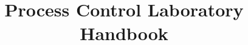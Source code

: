 \fussy

\usepackage{natbib}
\usepackage{graphicx}
\usepackage{color}
\usepackage{subfigure}
\usepackage{amsmath,amssymb}
\usepackage{rotating}
\usepackage{booktabs}
\usepackage{lscape}
\usepackage[hang, bf, small]{caption}
\usepackage{hyperref}
\usepackage{listings}
\usepackage{nomencl}
\makeglossary %
\usepackage{makeidx}
\makeindex %

\usepackage[Conny]{fncychap}
\ChTitleVar{\centering\Huge\mdseries\sffamily}
\ChRuleWidth{1pt}
\usepackage{fancyhdr}
	\lhead{}
\usepackage[french, thinspaces]{fancynum}	
\usepackage[thmmarks]{ntheorem}
	\theoremstyle{plain}
	\theoremsymbol{\ensuremath{\rule{0.3em}{0.3em}}}
	\theoremseparator{:}
	\theoremindent 1cm

\graphicspath{{graph/}}

\newcommand\tagname[1]{{\scshape \small #1}}
\newcommand\console[1]{\ttfamily #1}
\newcommand{\fullwidth}{0.7\textwidth}
\newcommand{\halfwidth}{0.4\textwidth}

\renewcommand\({\begin{equation}}
\renewcommand\){\end{equation}}
\renewcommand\deg{\ensuremath{^\circ}}

\newcommand{\eindex}[1]{\emph{#1}\index{#1}}
\newtheorem{example}{Example}[chapter]
\newenvironment{overview}{\begin{quote}}{\end{quote}}

\newcommand\thetitle{Process Control Laboratory Handbook}
\title{\thetitle}
\newcommand\theauthor{Lourens du Plessis and Carl Sandrock}
